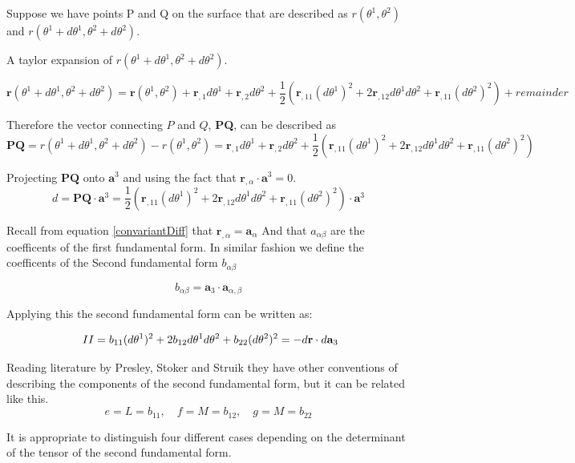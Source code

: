 Suppose we have points P and Q on the surface that are described as $r(\theta^1, \theta^2)$ and $r(\theta^1 + d\theta^1, \theta^2 + d\theta^2)$.

A taylor expansion of $r(\theta^1 + d\theta^1, \theta^2 + d\theta^2)$.

$$
\textbf{r}(\theta^1 + d\theta^1, \theta^2 + d\theta^2)= \textbf{r}(\theta^1, \theta^2) + \textbf{r}_{,1} d\theta^1 + \textbf{r}_{,2} d\theta^2 + \frac{1}{2}(\textbf{r}_{,11}(d\theta^1)^2 + 2\textbf{r}_{,12}d\theta^1 d\theta^2 + \textbf{r}_{,11}(d\theta^2)^2) + remainder
$$

Therefore the vector connecting $P$ and $Q$, \textbf{PQ}, can be described as
$$
\textbf{PQ} = r(\theta^1 + d\theta^1, \theta^2 + d\theta^2) - r(\theta^1, \theta^2) =  \textbf{r}_{,1} d\theta^1 + \textbf{r}_{,2} d\theta^2 + \frac{1}{2}(\textbf{r}_{,11}(d\theta^1)^2 + 2\textbf{r}_{,12}d\theta^1 d\theta^2 + \textbf{r}_{,11}(d\theta^2)^2) 
$$

Projecting $\textbf{PQ}$ onto $\textbf{a}^3$ and using the fact that $\textbf{r}_{,\alpha}\cdot\textbf{a}^3 = 0$. 
$$
d = \textbf{PQ}\cdot\textbf{a}^3 = \frac{1}{2}(\textbf{r}_{,11}(d\theta^1)^2 + 2\textbf{r}_{,12}d\theta^1 d\theta^2 + \textbf{r}_{,11}(d\theta^2)^2) \cdot \textbf{a}^3 
$$

 Recall from equation \ref{convariantDiff} that $\textbf{r}_{,\alpha} = \textbf{a}_\alpha$ And that $a_{\alpha\beta}$ are the coefficents of the first fundamental form. In similar fashion we define the coefficents of the Second fundamental form $b_{\alpha\beta}$ 

\begin{equation}
b_{\alpha\beta} = \textbf{a}_3 \cdot \textbf{a}_{\alpha,\beta} 
\end{equation}

Applying this the second fundamental form can be written as:

$$ ~\upperRomannumeral{2} = b_{11}(d\theta^1)^2 + 2b_{12}d\theta^1 d\theta^2 + b_{22}(d\theta^2)^2 = -d\textbf{r}\cdot d\textbf{a}_3$$

Reading literature by Presley, Stoker and Struik they have other conventions of describing the components of the second fundamental form, but it can be related like this.
$$ e = L = b_{11} ,\quad  f= M = b_{12},\quad
 g = M = b_{22}$$


It is appropriate to distinguish four different cases depending on the determinant of the tensor of the second fundamental form.\cite{ref:Stoker}

